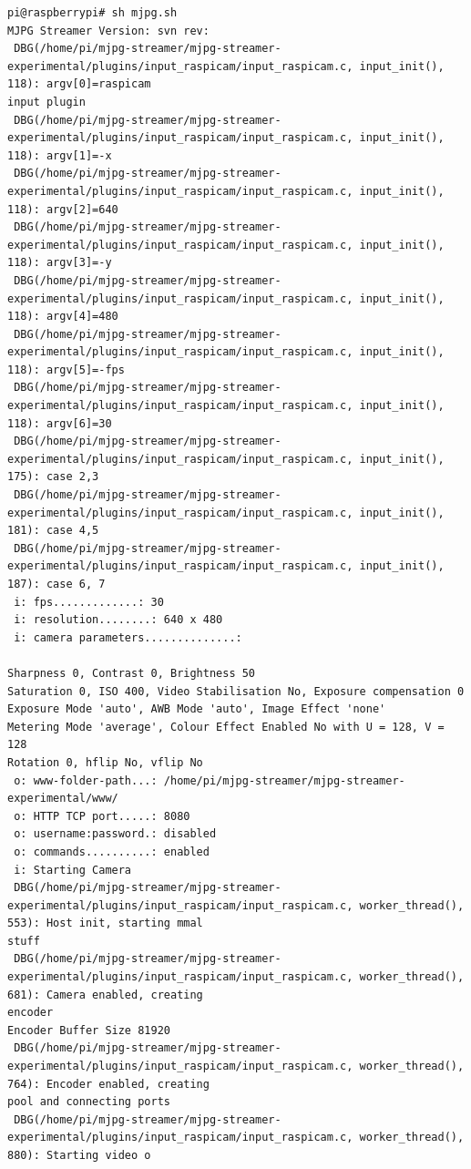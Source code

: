 \documentclass[11pt
  , a4paper
  , article
  , oneside
]{memoir}
\begin{document}
\begin{lstlisting}[style=termstyle]
pi@raspberrypi# sh mjpg.sh
MJPG Streamer Version: svn rev:
 DBG(/home/pi/mjpg-streamer/mjpg-streamer-experimental/plugins/input_raspicam/input_raspicam.c, input_init(), 118): argv[0]=raspicam 
input plugin
 DBG(/home/pi/mjpg-streamer/mjpg-streamer-experimental/plugins/input_raspicam/input_raspicam.c, input_init(), 118): argv[1]=-x
 DBG(/home/pi/mjpg-streamer/mjpg-streamer-experimental/plugins/input_raspicam/input_raspicam.c, input_init(), 118): argv[2]=640
 DBG(/home/pi/mjpg-streamer/mjpg-streamer-experimental/plugins/input_raspicam/input_raspicam.c, input_init(), 118): argv[3]=-y
 DBG(/home/pi/mjpg-streamer/mjpg-streamer-experimental/plugins/input_raspicam/input_raspicam.c, input_init(), 118): argv[4]=480
 DBG(/home/pi/mjpg-streamer/mjpg-streamer-experimental/plugins/input_raspicam/input_raspicam.c, input_init(), 118): argv[5]=-fps
 DBG(/home/pi/mjpg-streamer/mjpg-streamer-experimental/plugins/input_raspicam/input_raspicam.c, input_init(), 118): argv[6]=30
 DBG(/home/pi/mjpg-streamer/mjpg-streamer-experimental/plugins/input_raspicam/input_raspicam.c, input_init(), 175): case 2,3
 DBG(/home/pi/mjpg-streamer/mjpg-streamer-experimental/plugins/input_raspicam/input_raspicam.c, input_init(), 181): case 4,5
 DBG(/home/pi/mjpg-streamer/mjpg-streamer-experimental/plugins/input_raspicam/input_raspicam.c, input_init(), 187): case 6, 7
 i: fps.............: 30
 i: resolution........: 640 x 480
 i: camera parameters..............:

Sharpness 0, Contrast 0, Brightness 50
Saturation 0, ISO 400, Video Stabilisation No, Exposure compensation 0
Exposure Mode 'auto', AWB Mode 'auto', Image Effect 'none'
Metering Mode 'average', Colour Effect Enabled No with U = 128, V = 128
Rotation 0, hflip No, vflip No
 o: www-folder-path...: /home/pi/mjpg-streamer/mjpg-streamer-experimental/www/
 o: HTTP TCP port.....: 8080
 o: username:password.: disabled
 o: commands..........: enabled
 i: Starting Camera
 DBG(/home/pi/mjpg-streamer/mjpg-streamer-experimental/plugins/input_raspicam/input_raspicam.c, worker_thread(), 553): Host init, starting mmal 
stuff
 DBG(/home/pi/mjpg-streamer/mjpg-streamer-experimental/plugins/input_raspicam/input_raspicam.c, worker_thread(), 681): Camera enabled, creating 
encoder
Encoder Buffer Size 81920
 DBG(/home/pi/mjpg-streamer/mjpg-streamer-experimental/plugins/input_raspicam/input_raspicam.c, worker_thread(), 764): Encoder enabled, creating 
pool and connecting ports
 DBG(/home/pi/mjpg-streamer/mjpg-streamer-experimental/plugins/input_raspicam/input_raspicam.c, worker_thread(), 880): Starting video o
\end{lstlisting}
\end{document}
